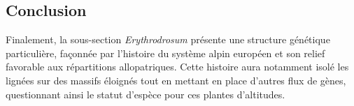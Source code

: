 \documentclass[../Master_report2.tex]{subfiles}
\begin{document}
\subsection{Conclusion}

Finalement, la sous-section \textit{Erythrodrosum} présente une structure génétique particulière, façonnée par l'histoire du système alpin européen et son relief favorable aux répartitions allopatriques. Cette histoire aura notamment isolé les lignées sur des massifs éloignés tout en mettant en place d'autres flux de gènes, questionnant ainsi le statut d'espèce pour ces plantes d'altitudes.


\biblio
\end{document}
